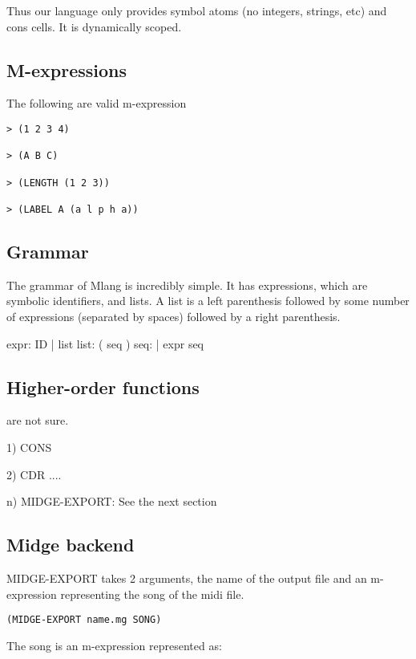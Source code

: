 \documentclass[letterpaper,11pt]{article}
\begin{document}
{Thus our language only provides symbol atoms (no integers, strings, etc)
and cons cells. It is dynamically scoped.


\subsection{M-expressions}


The following are valid m-expression
\lstset{breaklines=true,language=Lisp}
\begin{lstlisting}
> (1 2 3 4)

> (A B C)

> (LENGTH (1 2 3))

> (LABEL A (a l p h a))

\end{lstlisting}
\subsection{Grammar}


The grammar of Mlang is incredibly simple.
It has expressions, which are symbolic identifiers, and lists.
A list is a left parenthesis followed by some number of expressions (separated by spaces) followed by a right parenthesis.

expr:   ID | list
list:   ( seq )  
seq:       | expr seq

\subsection{Higher-order functions}

are not sure.

1) CONS

2) CDR
....

n) MIDGE-EXPORT: See the next section


\subsection{Midge backend}


MIDGE-EXPORT takes 2 arguments, the name of the output file and an m-expression representing the song of the midi file. 

\lstset{breaklines=true,language=Lisp}
\begin{lstlisting}
(MIDGE-EXPORT name.mg SONG)
\end{lstlisting}
The song is an m-expression represented as:

}
\end{document}
